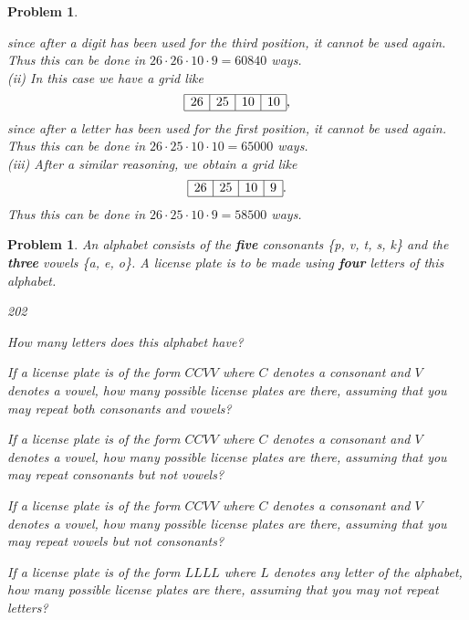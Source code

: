 \documentclass[11pt, openany]{book}
\theoremstyle{change} \theoremheaderfont{\blue\sffamily\bfseries}
\newtheorem{pro}[thm]{Problem}
\theoremstyle{nonumberplain} \theoremheaderfont{\sffamily\bfseries}
\newcommand{\í}{\'{\i}}
\begin{document}
\begin{multicols}{2}
\begin{pro}
\begin{answer}
since after a digit has been used for the third position, it cannot
be used again.
Thus this can be done in $26\cdot 26 \cdot 10\cdot 9 = 60840 $ ways.\\
(ii) In this case we have a grid like
$$\begin{array}{|c|c|c|c|}\hline 26 & 25 & 10 & 10    \\ \hline \end{array} , $$
since after a letter has been used for the first position, it
cannot be used again. Thus this can be done in $26\cdot 25 \cdot 10\cdot 10 = 65000$ ways. \\
(iii) After a similar reasoning, we obtain a grid like
$$\begin{array}{|c|c|c|c|}\hline 26 & 25 & 10 & 9    \\ \hline \end{array} . $$
Thus this can be done in $26\cdot 25 \cdot 10\cdot 9 = 58500$ ways.
\end{answer}
\end{pro}
  \begin{pro}
An alphabet consists of the {\bf five} consonants \{p, v, t, s, k\}
and the {\bf three} vowels \{a, e, o\}. A license plate is to be
made using {\bf four} letters of this
alphabet.\begin{dingautolist}{202}\item How many letters does this
alphabet have? \item If a license plate is of the form $CCVV$ where
$C$ denotes a consonant and $V$ denotes a vowel, how many possible
license plates are there, assuming that you may repeat both
consonants and vowels?
 \item If a license plate is of the form $CCVV$ where
$C$ denotes a consonant and $V$ denotes a vowel, how many possible
license plates are there, assuming that you may repeat  consonants
but not vowels? \item If a license plate is of the form $CCVV$ where
$C$ denotes a consonant and $V$ denotes a vowel, how many possible
license plates are there, assuming that you may repeat vowels but
not consonants?  \item If a license plate is of the form $LLLL$
where $L$ denotes any letter of the alphabet, how many possible
license plates are there, assuming that you may not repeat letters?
\end{dingautolist}
\end{pro}
\end{multicols}
\end{document}

